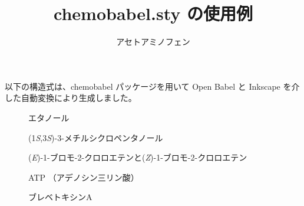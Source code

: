 \documentclass[dvipdfmx]{jsarticle}
\title{\textsf{chemobabel.sty} の使用例}
\author{アセトアミノフェン}
\begin{document}
\maketitle
以下の構造式は、\textsf{chemobabel} パッケージを用いて Open Babel と Inkscape を介した自動変換により生成しました。

\begin{figure}[ht]
  \centering
  \caption{エタノール}
\end{figure}

\begin{figure}[ht]
  \centering
  \caption{(1\textit{S},3\textit{S})-3-メチルシクロペンタノール}
\end{figure}

\begin{figure}[ht]
  \centering
  \caption{(\textit{E})-1-ブロモ-2-クロロエテンと(\textit{Z})-1-ブロモ-2-クロロエテン}
\end{figure}

\begin{figure}[ht]
  \centering
  \caption{ATP （アデノシン三リン酸）}
\end{figure}

\begin{figure}[ht]
  \centering
  \caption{ブレベトキシンA}
\end{figure}
\end{document}

